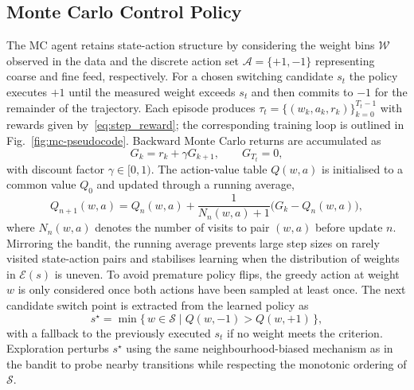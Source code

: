 \documentclass[journal]{IEEEtranTIE}
\begin{document}
\subsection{Monte Carlo Control Policy}
The MC agent retains state-action structure by considering the weight bins $\mathcal{W}$ observed in the data and the discrete action set $\mathcal{A}=\{+1,-1\}$ representing coarse and fine feed, respectively. For a chosen switching candidate $s_t$ the policy executes $+1$ until the measured weight exceeds $s_t$ and then commits to $-1$ for the remainder of the trajectory. Each episode produces $\tau_t=\{(w_k,a_k,r_k)\}_{k=0}^{T_t-1}$ with rewards given by~\eqref{eq:step_reward}; the corresponding training loop is outlined in Fig.~\ref{fig:mc-pseudocode}. Backward Monte Carlo returns are accumulated as
\begin{equation}
  G_k = r_k + \gamma G_{k+1}, \qquad G_{T_t}=0,
  \label{eq:mc_return}
\end{equation}
with discount factor $\gamma\in[0,1)$. The action-value table $Q(w,a)$ is initialised to a common value $Q_0$ and updated through a running average,
\begin{equation}
  Q_{n+1}(w,a) = Q_n(w,a) + \frac{1}{N_n(w,a)+1}\bigl(G_k - Q_n(w,a)\bigr),
  \label{eq:mc_update}
\end{equation}
where $N_n(w,a)$ denotes the number of visits to pair $(w,a)$ before update $n$. Mirroring the bandit, the running average prevents large step sizes on rarely visited state-action pairs and stabilises learning when the distribution of weights in $\mathcal{E}(s)$ is uneven. To avoid premature policy flips, the greedy action at weight $w$ is only considered once both actions have been sampled at least once. The next candidate switch point is extracted from the learned policy as
\begin{equation}
  s^\star = \min\bigl\{\,w\in\mathcal{S}\;\big|\;Q(w,-1) > Q(w,+1)\,\bigr\},
  \label{eq:mc_policy}
\end{equation}
with a fallback to the previously executed $s_t$ if no weight meets the criterion. Exploration perturbs $s^\star$ using the same neighbourhood-biased mechanism as in the bandit to probe nearby transitions while respecting the monotonic ordering of $\mathcal{S}$.
\end{document}
